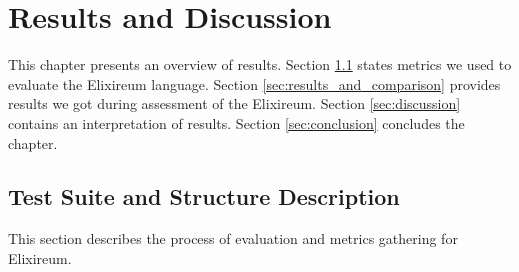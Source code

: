 \chapter{Results and Discussion}
\label{chap:res}






    

This chapter presents an overview of results. Section \ref{sec:test_suite} states metrics we used to evaluate the Elixireum language. Section \ref{sec:results_and_comparison} provides results we got during assessment of the Elixireum. Section \ref{sec:discussion} contains an interpretation of results. Section \ref{sec:conclusion} concludes the chapter.

\section{Test Suite and Structure Description}
\label{sec:test_suite}


This section describes the process of evaluation and metrics gathering for Elixireum.

